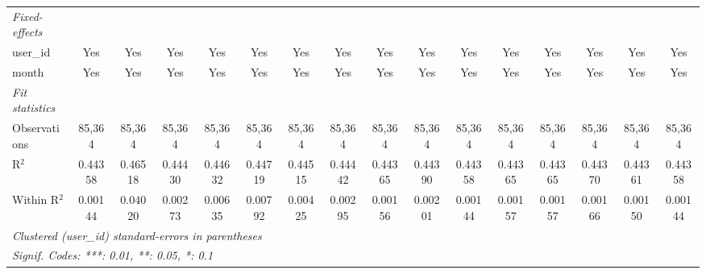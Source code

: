 \begin{table}[htbp]
\begin{tiny}
\begin{tabular}{lccccccccccccccc}
         \midrule \emph{Fixed-effects} &   &   &   &   &   &   &   &   &   &   &   &   &   &   &  \\
         user\_id                & Yes             & Yes             & Yes             & Yes             & Yes             & Yes             & Yes             & Yes             & Yes             & Yes             & Yes             & Yes             & Yes             & Yes             & Yes\\
         month                    & Yes             & Yes             & Yes             & Yes             & Yes             & Yes             & Yes             & Yes             & Yes             & Yes             & Yes             & Yes             & Yes             & Yes             & Yes\\
         \midrule \emph{Fit statistics} &   &   &   &   &   &   &   &   &   &   &   &   &   &   &  \\
         Observations             & 85,364          & 85,364          & 85,364          & 85,364          & 85,364          & 85,364          & 85,364          & 85,364          & 85,364          & 85,364          & 85,364          & 85,364          & 85,364          & 85,364          & 85,364\\
         R$^2$                    & 0.44358         & 0.46518         & 0.44430         & 0.44632         & 0.44719         & 0.44515         & 0.44442         & 0.44365         & 0.44390         & 0.44358         & 0.44365         & 0.44365         & 0.44370         & 0.44361         & 0.44358\\
         Within R$^2$             & 0.00144         & 0.04020         & 0.00273         & 0.00635         & 0.00792         & 0.00425         & 0.00295         & 0.00156         & 0.00201         & 0.00144         & 0.00157         & 0.00157         & 0.00166         & 0.00150         & 0.00144\\
         \midrule\midrule\multicolumn{16}{l}{\emph{Clustered (user\_id) standard-errors in parentheses}}\\
         \multicolumn{16}{l}{\emph{Signif. Codes: ***: 0.01, **: 0.05, *: 0.1}}\\
      \end{tabular}
   \end{tiny}
\end{table}


